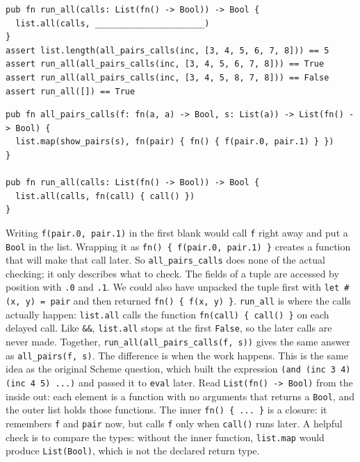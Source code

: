 \begin{parts}
\begin{blocksection}
\begin{lstlisting}
pub fn run_all(calls: List(fn() -> Bool)) -> Bool {
  list.all(calls, ______________________)
}
assert list.length(all_pairs_calls(inc, [3, 4, 5, 6, 7, 8])) == 5
assert run_all(all_pairs_calls(inc, [3, 4, 5, 6, 7, 8])) == True
assert run_all(all_pairs_calls(inc, [3, 4, 5, 8, 7, 8])) == False
assert run_all([]) == True
\end{lstlisting}
\begin{solution}
\begin{lstlisting}
pub fn all_pairs_calls(f: fn(a, a) -> Bool, s: List(a)) -> List(fn() -> Bool) {
  list.map(show_pairs(s), fn(pair) { fn() { f(pair.0, pair.1) } })
}

pub fn run_all(calls: List(fn() -> Bool)) -> Bool {
  list.all(calls, fn(call) { call() })
}
\end{lstlisting}
\end{solution}
\begin{questionmeta}
   Writing \lstinline{f(pair.0, pair.1)} in the first blank would call \texttt{f} right away and put a \lstinline{Bool} in the list. Wrapping it as \lstinline|fn() { f(pair.0, pair.1) }| creates a function that will make that call later. So \texttt{all\_pairs\_calls} does none of the actual checking; it only describes what to check. The fields of a tuple are accessed by position with \lstinline{.0} and \lstinline{.1}. We could also have unpacked the tuple first with \lstinline|let #(x, y) = pair| and then returned \lstinline|fn() { f(x, y) }|.
   \texttt{run\_all} is where the calls actually happen: \lstinline{list.all} calls the function \lstinline|fn(call) { call() }| on each delayed call. Like \lstinline{&&}, \lstinline{list.all} stops at the first \lstinline{False}, so the later calls are never made.
   Together, \lstinline{run_all(all_pairs_calls(f, s))} gives the same answer as \lstinline{all_pairs(f, s)}. The difference is when the work happens. This is the same idea as the original Scheme question, which built the expression \lstinline{(and (inc 3 4) (inc 4 5) ...)} and passed it to \texttt{eval} later.
   Read \lstinline{List(fn() -> Bool)} from the inside out: each element is a function with no arguments that returns a \lstinline{Bool}, and the outer list holds those functions. The inner \lstinline|fn() { ... }| is a closure: it remembers \texttt{f} and \texttt{pair} now, but calls \texttt{f} only when \texttt{call()} runs later. A helpful check is to compare the types: without the inner function, \lstinline{list.map} would produce \lstinline{List(Bool)}, which is not the declared return type.
\end{questionmeta}
\end{blocksection}
\end{parts}
